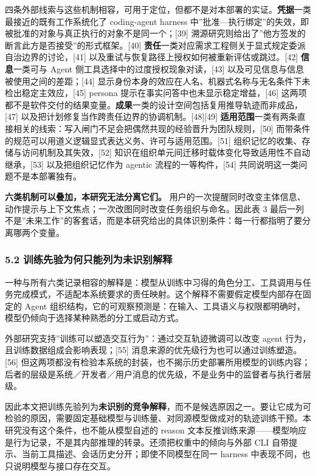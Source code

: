 \documentclass[
]{article}
\begin{document}
四条外部线索与这些机制相容，可用于定位，但都不是对本部署的实证。\textbf{凭据}一类最接近的既有工作系统化了
coding-agent harness
中''批准---执行绑定''的失效，即被批准的对象与真正执行的对象不是同一个；{[}39{]}
溯源研究则给出了''他方签发的断言此方是否接受''的形式框架。{[}40{]}
\textbf{责任}一类对应需求工程侧关于显式规定委派自治边界的讨论，{[}41{]}
以及重试与恢复路径上授权如何被重新评估或跳过。{[}42{]}
\textbf{信息}一类可与 Agent 侧工具选择中的过度授权现象对读，{[}43{]}
以及可见信息与信息被使用之间的差距；{[}44{]}
显示身份本身的效应在人名、机器式名称与无名条件下未检出稳定主效应，{[}45{]}
persona 提示在事实问答中也未显示稳定增益，{[}46{]}
这两项都不是软件交付的结果变量。\textbf{成果}一类的设计空间包括复用推导轨迹而非成品，{[}47{]}
以及把计划修复当作跨责任边界的协调机制。{[}48{]}{[}49{]}
\textbf{适用范围}一类有两条直接相关的线索：写入闸门不足会把偶然共现的经验晋升为团队规则，{[}50{]}
而带条件的规范可以用道义逻辑显式表达义务、许可与适用范围。{[}51{]}
组织记忆的收集、存储与访问机制及其失效，{[}52{]}
知识在组织单元间迁移时载体变化导致适用性不自动继承，{[}53{]}
以及把组织记忆作为 agentic 流程的一等构件，{[}54{]}
共同说明这一类问题不是本部署独有。

\textbf{六类机制可以叠加，本研究无法分离它们。}
用户的一次提醒同时改变主体信息、动作提示与上下文焦点；一次改图同时改变任务组织与命名。因此表
3
最后一列不是''未来工作''的客套话，而是本研究给出的具体识别条件：每一行都指明了要分离哪两个变量。

\subsubsection{5.2
训练先验为何只能列为未识别解释}\label{ux8badux7ec3ux5148ux9a8cux4e3aux4f55ux53eaux80fdux5217ux4e3aux672aux8bc6ux522bux89e3ux91ca}

一种与所有六类记录相容的解释是：模型从训练中习得的角色分工、工具调用与任务完成模式，不适配本系统要求的责任映射。这个解释不需要假定模型内部存在固定的
Agent
组织结构，它的可观察预测是：在输入、工具语义与权限都明确时，模型仍倾向于选择某种熟悉的分工或启动方式。

外部研究支持''训练可以塑造交互行为''：通过交互轨迹微调可以改变 agent
行为，且训练数据组成会影响表现；{[}55{]}
消息来源的优先级行为也可以通过训练塑造。{[}56{]}
但这两项都没有检验本系统的封装，也不揭示历史部署所用模型的训练内容；后者的层级是系统／开发者／用户消息的优先级，不是业务中的监督者与执行者层级。

因此本文把训练先验列为\textbf{未识别的竞争解释}，而不是候选原因之一。要让它成为可检验的原因，需要固定基础模型与训练量、对同源模型做成对的轨迹训练干预。本研究没有这个条件，也不能从模型自述的
reason
文本反推训练来源------模型响应是行为记录，不是其内部推理的转录。还须把权重中的倾向与外部
CLI 自带提示、当前工具描述、会话历史分开；即使不同模型在同一 harness
中表现不同，也只说明模型与接口存在交互。
\end{document}
